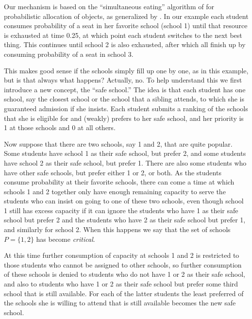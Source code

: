 \documentclass[12pt]{article}
\theoremstyle{definition}
\begin{document}
Our mechanism is based on the ``simultaneous eating'' algorithm of
\cite{bm01} for probabilistic allocation of objects, as generalized by
\cite{balbuzanov22jet}.  In our example each student consumes
probability of a seat in her favorite school (school 1) until that
resource is exhausted at time 0.25, at which point each student
switches to the next best thing.  This continues until school 2 is
also exhausted, after which all finish up by consuming probability of
a seat in school 3.

This makes good sense if the schools simply fill up one by one, as in
this example, but is that always what happens?  Actually, no.  To help
understand this we first introduce a new concept, the ``safe school.''
The idea is that each student has one school, say the closest school
or the school that a sibling attends, to which she is guaranteed
admission if she insists.  Each student submits a ranking of the
schools that she is eligible for and (weakly) prefers to her safe
school, and her priority is 1 at those schools and 0 at all others.

Now suppose that there are two schools, say 1 and 2, that are quite
popular.  Some students have school 1 as their safe school, but prefer
2, and some students have school 2 as their safe school, but prefer 1.
There are also some students who have other safe schools, but prefer
either 1 or 2, or both.  As the students consume probability at their
favorite schools, there can come a time at which schools 1 and 2
together only have enough remaining capacity to serve the students who
can insist on going to one of these two schools, even though school 1
still has excess capacity if it can ignore the students who have 1 as
their safe school but prefer 2 and the students who have 2 as their
safe school but prefer 1, and similarly for school 2.  When this
happens we say that the set of schools $P = \{1,2\}$ has become
\emph{critical}.

At this time further consumption of capacity at schools 1 and 2 is
restricted to those students who cannot be assigned to other schools,
so further consumption of these schools is denied to students who do
not have 1 or 2 as their safe school, and also to students who have 1
or 2 as their safe school but prefer some third school that is still
available.  For each of the latter students the least preferred of the
schools she is willing to attend that is still available becomes the
new safe school.
\end{document}
